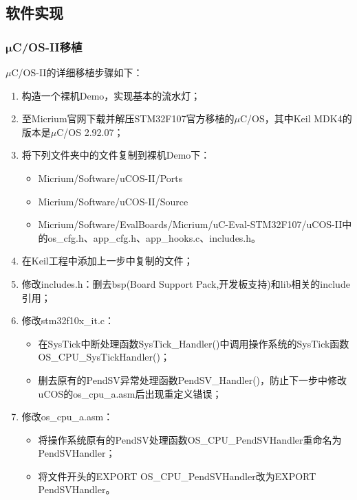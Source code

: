 \documentclass[a4paper]{ctexart}
\begin{document}
\begin{spacing}{1.3}
	\subsection{软件实现}
	\subsubsection{$\bm\mu$C/OS-II移植}\label{uCOS移植}
	$\mu$C/OS-II的详细移植步骤如下：
	\begin{enumerate}[label=\arabic*、]
		\item 构造一个裸机Demo，实现基本的流水灯；
		\item 至Micrium官网下载并解压STM32F107官方移植的$\mu$C/OS，其中Keil MDK4的版本是$\mu$C/OS 2.92.07；
		\item 将下列文件夹中的文件复制到裸机Demo下：
		\begin{itemize}
			\item Micrium/Software/uCOS-II/Ports
			\item Micrium/Software/uCOS-II/Source
			\item Micrium/Software/EvalBoards/Micrium/uC-Eval-STM32F107/uCOS-II中的\newline os\_cfg.h、app\_cfg.h、app\_hooks.c、includes.h。
		\end{itemize}
		\item 在Keil工程中添加上一步中复制的文件；
		\item 修改includes.h：删去bsp(Board Support Pack,开发板支持)和lib相关的include引用；
		\item 修改stm32f10x\_it.c：
		\begin{itemize}
			\item 在SysTick中断处理函数SysTick\_Handler()中调用操作系统的SysTick函数OS\_CPU\_SysTickHandler()；
			\item 删去原有的PendSV异常处理函数PendSV\_Handler()，防止下一步中修改uCOS的os\_cpu\_a.asm后出现重定义错误；
		\end{itemize}
		\item 修改os\_cpu\_a.asm：
		\begin{itemize}
			\item 将操作系统原有的PendSV处理函数OS\_CPU\_PendSVHandler重命名为PendSVHandler；
			\item 将文件开头的EXPORT OS\_CPU\_PendSVHandler改为EXPORT PendSVHandler。
		\end{itemize}
	\end{enumerate}

\end{spacing}
\end{document}
